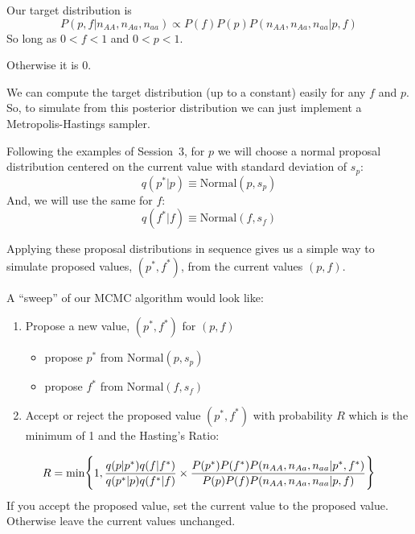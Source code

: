 Our target distribution is 
\[
P(p,f|n_{AA},n_{Aa},n_{aa}) \propto P(f)P(p)P(n_{AA},n_{Aa},n_{aa}|p,f)
\]
So long as $0< f< 1$ and $0<p<1$.

Otherwise it is 0.


We can compute the target distribution (up to a constant) easily for any $f$ and $p$.   So, to simulate from this posterior distribution we can just implement a Metropolis-Hastings sampler.  

Following the examples of Session~3, for $p$ we will choose a normal proposal distribution centered on the current value with standard deviation of $s_p$:
\[
	q(p^*|p) \equiv \mathrm{Normal}(p,s_p)
\]
And, we will use the same for $f$:
\[
	q(f^*|f) \equiv \mathrm{Normal}(f,s_f)
\]

Applying these proposal distributions in sequence gives us a simple way to simulate proposed values, $(p^*,f^*)$, from the current values $(p,f)$.

\newpage

A ``sweep'' of our MCMC algorithm would look like:
\begin{enumerate}
\item Propose a new value, $(p^*,f^*)$ for $(p,f)$
\begin{itemize}
\item propose $p^*$ from $\mathrm{Normal}(p,s_p)$
\item propose $f^*$ from $\mathrm{Normal}(f,s_f)$
\end{itemize}
\item Accept or reject the proposed value $(p^*,f^*)$ with probability $R$ which is the minimum of 1 and the Hasting's Ratio:
\end{enumerate}
\[
\small
R=\min\biggr\{1,
\frac{q(p|p^*)q(f|f^*)}{q(p^*|p)q(f^*|f) } \times 
\frac{P(p^*)P(f^*)P(n_{AA},n_{Aa},n_{aa}|p^*,f^*)}{P(p)P(f)P(n_{AA},n_{Aa},n_{aa}|p,f)}
\biggl\}
\]
If you accept the proposed value, set the current value to the proposed value.  Otherwise leave the current values unchanged.



